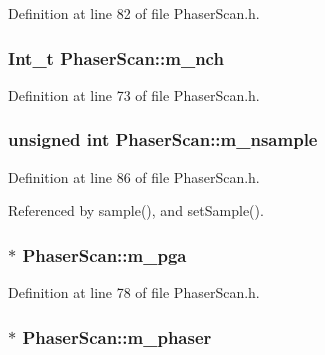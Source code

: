 Definition at line 82 of file PhaserScan.h.\hypertarget{classPhaserScan_aa73583dea3f784eaacaffdd356e51e9d}{
\subsubsection[{m\_\-nch}]{\setlength{\rightskip}{0pt plus 5cm}Int\_\-t {\bf PhaserScan::m\_\-nch}}}
\label{classPhaserScan_aa73583dea3f784eaacaffdd356e51e9d}


Definition at line 73 of file PhaserScan.h.\hypertarget{classPhaserScan_a6c2089bb98fa8a897430b17ddb052447}{
\subsubsection[{m\_\-nsample}]{\setlength{\rightskip}{0pt plus 5cm}unsigned int {\bf PhaserScan::m\_\-nsample}}}
\label{classPhaserScan_a6c2089bb98fa8a897430b17ddb052447}


Definition at line 86 of file PhaserScan.h.

Referenced by sample(), and setSample().\hypertarget{classPhaserScan_a2065860536763c7f9fd6b8b41908e673}{
\subsubsection[{m\_\-pga}]{$\ast$ {\bf PhaserScan::m\_\-pga}}}
\label{classPhaserScan_a2065860536763c7f9fd6b8b41908e673}


Definition at line 78 of file PhaserScan.h.\hypertarget{classPhaserScan_ae2726b0d199ca8ae713cea55866d4ae3}{
\subsubsection[{m\_\-phaser}]{$\ast$ {\bf PhaserScan::m\_\-phaser}}}
\label{classPhaserScan_ae2726b0d199ca8ae713cea55866d4ae3}



